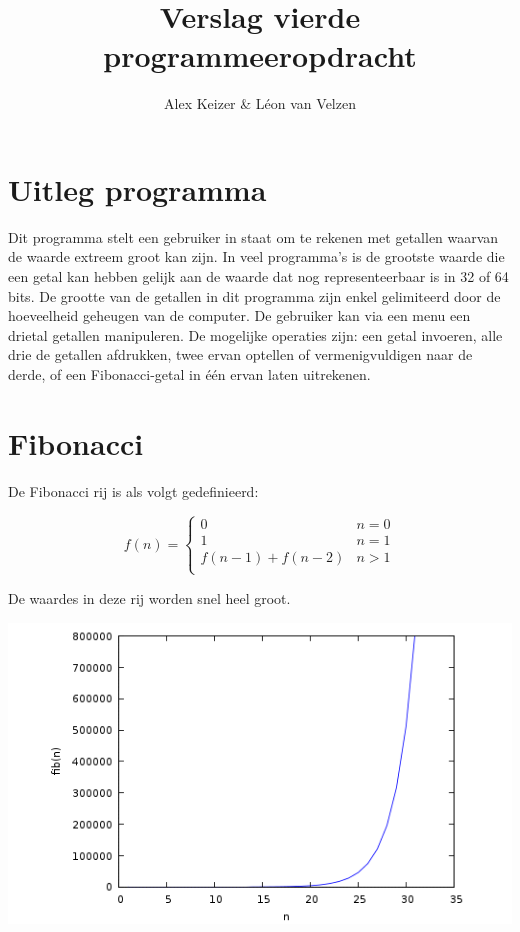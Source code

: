 \documentclass[13pt]{article}
\title{\vspace{-1.3cm} Verslag vierde programmeeropdracht}
\author{Alex Keizer \& L\'{e}on van Velzen}
\begin{document}
\maketitle
\section{Uitleg programma}

Dit programma stelt een gebruiker in staat om te rekenen met getallen waarvan de waarde extreem groot kan zijn. In veel programma's is de grootste waarde die een getal kan hebben gelijk aan de waarde dat nog representeerbaar is in 32 of 64 bits. De grootte van de getallen in dit programma zijn enkel gelimiteerd door de hoeveelheid geheugen van de computer. De gebruiker kan via een menu een drietal getallen manipuleren. De mogelijke operaties zijn: een getal invoeren, alle drie de getallen afdrukken, twee ervan optellen of vermenigvuldigen naar de derde, of een Fibonacci-getal in \'e\'en ervan laten uitrekenen. 

\section{Fibonacci}

De Fibonacci rij is als volgt gedefinieerd:

\begin{equation*}
    f(n) = \begin{cases}
               0               & n = 0\\
               1               & n = 1\\
               f(n-1) + f(n-2) & n > 1\\
           \end{cases}
\end{equation*}

De waardes in deze rij worden snel heel groot.

\begin{center}
    \includegraphics[scale=0.6]{graph.png}
\end{center}
\end{document}
